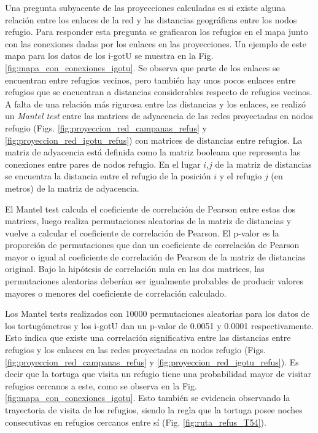 Una pregunta subyacente de las proyecciones calculadas es si existe alguna relación entre los enlaces de la red y las distancias geográficas entre los nodos refugio. Para responder esta pregunta se graficaron los refugios en el mapa junto con las conexiones dadas por los enlaces en las proyecciones. Un ejemplo de este mapa para los datos de los i-gotU se muestra en la Fig. \ref{fig:mapa_con_conexiones_igotu}. Se observa que parte de los enlaces se encuentran entre refugios vecinos, pero también hay unos pocos enlaces entre refugios que se encuentran a distancias considerables respecto de refugios vecinos. A falta de una relación más rigurosa entre las distancias y los enlaces, se realizó un \textit{Mantel test} \cite{MantelTest} entre las matrices de adyacencia de las redes proyectadas en nodos refugio (Figs. \ref{fig:proyeccion_red_campanas_refus} y \ref{fig:proyeccion_red_igotu_refus}) con matrices de distancias entre refugios. La matriz de adyacencia está definida como la matriz booleana que representa las conexiones entre pares de nodos refugio. En el lugar $i$,$j$ de la matriz de distancias se encuentra la distancia entre el refugio  de la posición $i$ y el refugio $j$ (en metros) de la matriz de adyacencia.
 
El Mantel test calcula el coeficiente de correlación de Pearson entre estas dos matrices, luego realiza permutaciones aleatorias de la matriz de distancias y vuelve a calcular el coeficiente de correlación de Pearson. El p-valor es la proporción de permutaciones que dan un coeficiente de correlación de Pearson mayor o igual al coeficiente de correlación de Pearson de la matriz de distancias original. Bajo la hipótesis de correlación nula en las dos matrices, las permutaciones aleatorias deberían ser igualmente probables de producir valores mayores o menores del coeficiente de correlación calculado.
 
 
Los Mantel tests realizados con 10000 permutaciones aleatorias para los datos de los tortugómetros y los i-gotU dan un p-valor de 0.0051 y 0.0001 respectivamente. Esto indica que existe una correlación significativa entre las distancias entre refugios y los enlaces en las redes proyectadas en nodos refugio (Figs. \ref{fig:proyeccion_red_campanas_refus} y \ref{fig:proyeccion_red_igotu_refus}). Es decir que la tortuga que visita un refugio tiene una probabilidad mayor de visitar refugios cercanos a este, como se observa en la Fig. \ref{fig:mapa_con_conexiones_igotu}. Esto también se evidencia observando la trayectoria de visita de los refugios, siendo la regla que la tortuga posee noches consecutivas en refugios cercanos entre sí (Fig. \ref{fig:ruta_refus_T54}).
 
